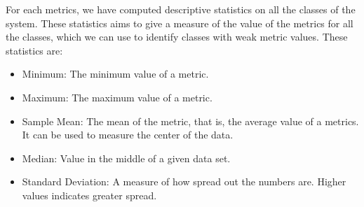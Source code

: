 For each metrics, we have computed descriptive statistics on all the classes of the system. These statistics aims to give a measure of the value of the metrics for all the classes, which we can use to identify classes with weak metric values. These statistics are:

\begin{itemize}
	\item Minimum: The minimum value of a metric.
	\item Maximum: The maximum value of a metric.
	\item Sample Mean: The mean of the metric, that is, the average value of a metrics. It can be used to measure the center of the data.
	\item Median: Value in the middle of a given data set.
	\item Standard Deviation: A measure of how spread out the numbers are. Higher values indicates greater spread.
\end{itemize}



